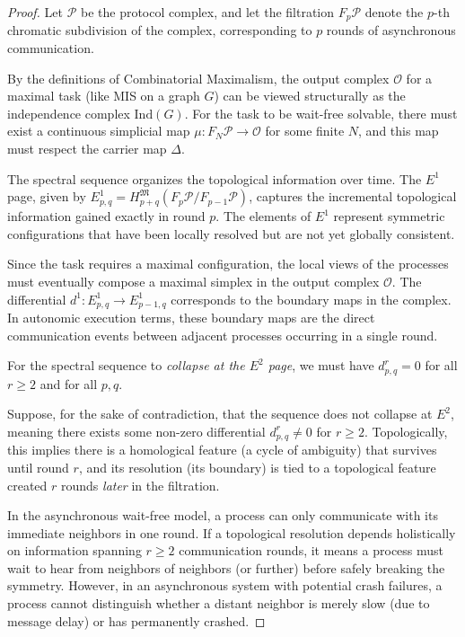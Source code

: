 \begin{proof}
Let $\mathcal{P}$ be the protocol complex, and let the filtration $F_p \mathcal{P}$ denote the $p$-th chromatic subdivision of the complex, corresponding to $p$ rounds of asynchronous communication. 

By the definitions of Combinatorial Maximalism, the output complex $\mathcal{O}$ for a maximal task (like MIS on a graph $G$) can be viewed structurally as the independence complex $\text{Ind}(G)$.
For the task to be wait-free solvable, there must exist a continuous simplicial map $\mu: F_N \mathcal{P} \to \mathcal{O}$ for some finite $N$, and this map must respect the carrier map $\Delta$.

The spectral sequence organizes the topological information over time. The $E^1$ page, given by $E_{p,q}^1 = H_{p+q}^{\mathfrak{M}}(F_p \mathcal{P} / F_{p-1} \mathcal{P})$, captures the incremental topological information gained exactly in round $p$. The elements of $E^1$ represent symmetric configurations that have been locally resolved but are not yet globally consistent.

Since the task requires a maximal configuration, the local views of the processes must eventually compose a maximal simplex in the output complex $\mathcal{O}$. The differential $d^1: E^1_{p,q} \to E^1_{p-1, q}$ corresponds to the boundary maps in the complex. In autonomic execution terms, these boundary maps are the direct communication events between adjacent processes occurring in a single round.

For the spectral sequence to \textit{collapse at the $E^2$ page}, we must have $d^r_{p,q} = 0$ for all $r \ge 2$ and for all $p, q$.

Suppose, for the sake of contradiction, that the sequence does not collapse at $E^2$, meaning there exists some non-zero differential $d^r_{p,q} \neq 0$ for $r \ge 2$. 
Topologically, this implies there is a homological feature (a cycle of ambiguity) that survives until round $r$, and its resolution (its boundary) is tied to a topological feature created $r$ rounds \textit{later} in the filtration. 

In the asynchronous wait-free model, a process can only communicate with its immediate neighbors in one round. If a topological resolution depends holistically on information spanning $r \ge 2$ communication rounds, it means a process must wait to hear from neighbors of neighbors (or further) before safely breaking the symmetry. However, in an asynchronous system with potential crash failures, a process cannot distinguish whether a distant neighbor is merely slow (due to message delay) or has permanently crashed. 


\end{proof}
